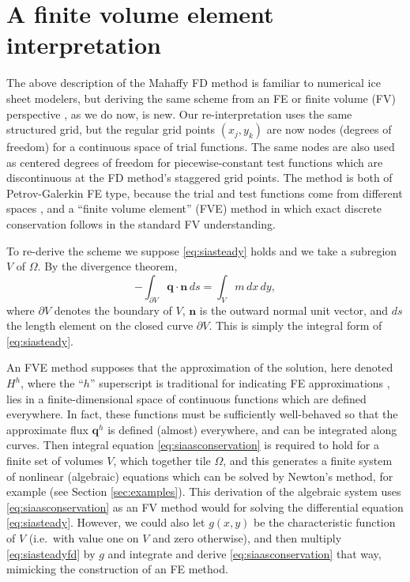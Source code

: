 \documentclass[11pt]{amsart}
\newcommand\bn{\mathbf{n}}
\newcommand\bq{\mathbf{q}}
\begin{document}
\section{A finite volume element interpretation} \label{sec:fveinterpretation}

The above description of the Mahaffy FD method is familiar to numerical ice sheet modelers, but deriving the same scheme from an FE or finite volume (FV) perspective \cite{LeVeque}, as we do now, is new.  Our re-interpretation uses the same structured grid, but the regular grid points $(x_j,y_k)$ are now nodes (degrees of freedom) for a continuous space of trial functions.  The same nodes are also used as centered degrees of freedom for piecewise-constant test functions which are discontinuous at the FD method's staggered grid points.  The method is both of Petrov-Galerkin FE type, because the trial and test functions come from different spaces \cite{Elmanetal2005}, and a ``finite volume element'' (FVE) method \cite{EwingLinLin2002} in which exact discrete conservation follows in the standard FV understanding.

To re-derive the scheme we suppose \eqref{eq:siasteady} holds and we take a subregion $V$ of $\Omega$.  By the divergence theorem,
\begin{equation}
  - \int_{\partial V} \bq \cdot \bn\,ds = \int_V m\, dx\,dy, \label{eq:siaasconservation}
\end{equation}
where $\partial V$ denotes the boundary of $V$, $\bn$ is the outward normal unit vector, and $ds$ the length element on the closed curve $\partial V$.  This is simply the integral form of \eqref{eq:siasteady}.

An FVE method supposes that the approximation of the solution, here denoted $H^h$, where the ``$h$'' superscript is traditional for indicating FE approximations \cite{Elmanetal2005}, lies in a finite-dimensional space of continuous functions which are defined everywhere.  In fact, these functions must be sufficiently well-behaved so that the approximate flux $\bq^h$ is defined (almost) everywhere, and can be integrated along curves.  Then integral equation \eqref{eq:siaasconservation} is required to hold for a finite set of volumes $V$, which together tile $\Omega$, and this generates a finite system of nonlinear (algebraic) equations which can be solved by Newton's method, for example (see Section \ref{sec:examples}).  This derivation of the algebraic system uses \eqref{eq:siaasconservation} as an FV method would for solving the differential equation \eqref{eq:siasteady}.  However, we could also let $g(x,y)$ be the characteristic function of $V$ (i.e.~with value one on $V$ and zero otherwise), and then multiply \eqref{eq:siasteadyfd} by $g$ and integrate and derive \eqref{eq:siaasconservation} that way, mimicking the construction of an FE method.
\end{document}
